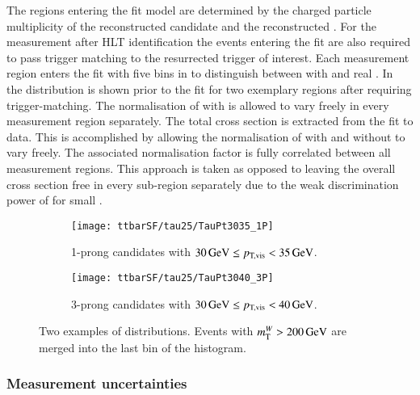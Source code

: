 The regions entering the fit model are determined by the charged
particle multiplicity of the reconstructed \tauhadvis candidate and
the reconstructed \tauhadvis \pT. For the measurement after HLT
\tauhadvis identification the events entering the fit are also
required to pass trigger matching to the resurrected trigger of
interest. Each measurement region enters the fit with five bins in
\mTW to distinguish between \ttbar with \faketauhadvis and real
\tauhadvis. In~ the \mTW
distribution is shown prior to the fit for two exemplary regions after
requiring trigger-matching.  The normalisation of \ttbar with
\faketauhadvis is allowed to vary freely in every measurement region
separately. The total \ttbar cross section is extracted from the fit
to data. This is accomplished by allowing the normalisation of \ttbar
with and without \faketauhadvis to vary freely. The associated
normalisation factor is fully correlated between all measurement
regions. This approach is taken as opposed to leaving the overall
\ttbar cross section free in every sub-region separately due to the
weak discrimination power of \mTW for small \tauhadvis \pT.


\begin{figure}[htbp]
  \centering

  \begin{subfigure}{.485\textwidth}
    \texttt{[image: ttbarSF/tau25/TauPt3035\_1P]}
    \caption{1-prong \tauhadvis candidates with
      $\SI{30}{\ensuremath{\text{GeV}}} \leq p_\text{T,vis} < \SI{35}{\ensuremath{\text{GeV}}}$.}
  \end{subfigure}\hfill%
  \begin{subfigure}{.485\textwidth}
    \texttt{[image: ttbarSF/tau25/TauPt3040\_3P]}
    \caption{3-prong \tauhadvis candidates with
      $\SI{30}{\GeV} \leq \pTvis < \SI{40}{\GeV}$.}
  \end{subfigure}

  \caption{Two examples of \mTW distributions. Events with
    $m_{\text{T}}^W > \SI{200}{\ensuremath{\text{GeV}}}$ are merged into the last bin of the
    histogram.}
  \label{fig:ttbarsf_mtw_examples_prefit}
\end{figure}


\subsubsection{Measurement uncertainties}

